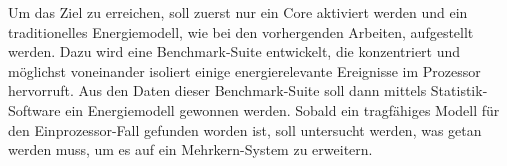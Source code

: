 \documentclass[a4paper,DIV=16]{scrartcl}
\newcommand{\JWlone}[1]{\medskip}
\begin{document}
\JWlone{Lösungsansatz}

Um das Ziel zu erreichen, soll zuerst nur ein Core aktiviert werden und ein
traditionelles Energiemodell, wie bei den vorhergenden Arbeiten, aufgestellt
werden. Dazu wird eine Benchmark-Suite entwickelt, die konzentriert und
möglichst voneinander isoliert einige energierelevante Ereignisse im Prozessor
hervorruft. Aus den Daten dieser Benchmark-Suite soll dann mittels
Statistik-Software ein Energiemodell gewonnen werden. Sobald ein tragfähiges
Modell für den Einprozessor-Fall gefunden worden ist, soll untersucht werden,
was getan werden muss, um es auf ein Mehrkern-System zu erweitern.
\end{document}
